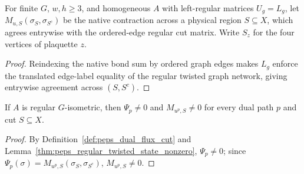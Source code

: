 \begin{definition}%
    \label{def:peps_dual_flux_cut}
    \leanok
    For finite $G$, $w,h\ge3$, and homogeneous $A$ with left-regular matrices
    $U_g=L_g$, let $M_{u,S}(\sigma_S,\sigma_{S^c})$ be the native contraction across
    a physical region $S\subseteq X$, which agrees entrywise with the
    ordered-edge regular cut matrix. Write $S_z$ for the four vertices of
    plaquette $z$.
\end{definition}
\begin{proof}\leanok
    Reindexing the native bond sum by ordered graph edges makes $L_g$ enforce
    the translated edge-label equality of the regular twisted graph network,
    giving entrywise agreement across $(S,S^c)$.
\end{proof}

\begin{lemma}%
    \label{thm:peps_dual_flux_nonzero}
    \leanok
    If $A$ is regular $G$-isometric, then $\Psi_p\ne0$ and $M_{u^p,S}\ne0$ for
    every dual path $p$ and cut $S\subseteq X$.
\end{lemma}
\begin{proof}\leanok
    By Definition~\ref{def:peps_dual_flux_cut} and
    Lemma~\ref{thm:peps_regular_twisted_state_nonzero}, $\Psi_p\ne0$; since
    $\Psi_p(\sigma)=M_{u^p,S}(\sigma_S,\sigma_{S^c})$, $M_{u^p,S}\ne0$.
\end{proof}

